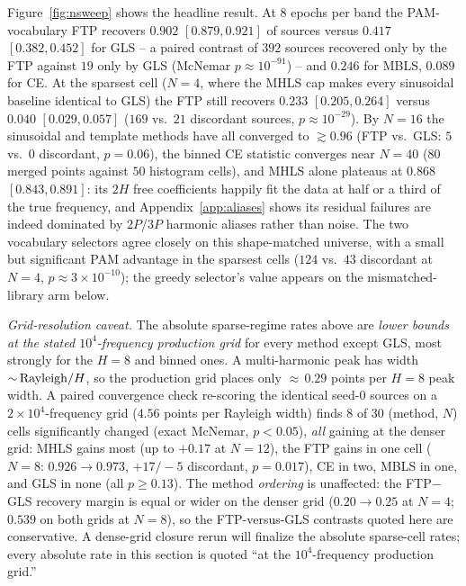 \documentclass[apj]{emulateapj}
\begin{document}
Figure~\ref{fig:nsweep} shows the headline result.  At $8$ epochs per
band the PAM-vocabulary FTP recovers $0.902$ $[0.879, 0.921]$ of
sources versus $0.417$ $[0.382, 0.452]$ for GLS -- a paired contrast of
$392$ sources recovered only by the FTP against $19$ only by GLS
(McNemar $p \approx 10^{-91}$) -- and $0.246$ for MBLS, $0.089$ for CE.
At the sparsest cell ($N = 4$, where the MHLS cap makes every
sinusoidal baseline identical to GLS) the FTP still recovers $0.233$
$[0.205, 0.264]$ versus $0.040$ $[0.029, 0.057]$ ($169$ vs.\ $21$
discordant sources, $p \approx 10^{-29}$).  By $N = 16$ the sinusoidal
and template methods have all converged to ${\gtrsim}0.96$ (FTP vs.\
GLS: $5$ vs.\ $0$ discordant, $p = 0.06$), the binned CE statistic
converges near $N = 40$ ($80$ merged points against $50$ histogram
cells), and MHLS alone plateaus at $0.868$ $[0.843, 0.891]$: its
$2H$ free coefficients happily fit the data at half or a third of the
true frequency, and Appendix~\ref{app:aliases} shows its residual
failures are indeed dominated by $2P$/$3P$ harmonic aliases rather than
noise.  The two vocabulary selectors agree closely on this
shape-matched universe, with a small but significant PAM advantage in
the sparsest cells ($124$ vs.\ $43$ discordant at $N = 4$,
$p \approx 3\times10^{-10}$); the greedy selector's value appears on
the mismatched-library arm below.

\emph{Grid-resolution caveat.}
The absolute sparse-regime rates above are \emph{lower bounds at the
stated $10^4$-frequency production grid} for every method except GLS,
most strongly for the $H = 8$ and binned ones.  A multi-harmonic peak has width ${\sim}\,{\rm Rayleigh}/H$, so
the production grid places only ${\approx}\,0.29$ points per $H = 8$
peak width.  A paired convergence check re-scoring the identical seed-0
sources on a $2\times10^4$-frequency grid ($4.56$ points per Rayleigh
width) finds $8$ of $30$ (method, $N$) cells significantly changed
(exact McNemar, $p < 0.05$), \emph{all} gaining at the denser grid:
MHLS gains most (up to $+0.17$ at $N = 12$), the FTP gains in one cell
($N = 8$: $0.926 \rightarrow 0.973$, $+17/-5$ discordant, $p = 0.017$),
CE in two, MBLS in one, and GLS in none (all $p \geq 0.13$).  The
method \emph{ordering} is unaffected: the FTP$-$GLS recovery margin is
equal or wider on the denser grid ($0.20 \rightarrow 0.25$ at $N = 4$;
$0.539$ on both grids at $N = 8$), so the FTP-versus-GLS contrasts
quoted here are conservative.  A dense-grid closure rerun will finalize
the absolute sparse-cell rates; every absolute rate in this section is
quoted ``at the $10^4$-frequency production grid.''
\end{document}

